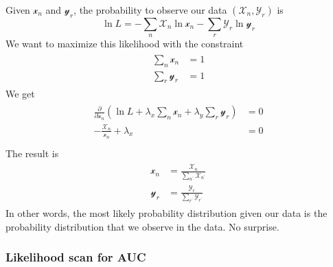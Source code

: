 \documentclass[11pt]{article}
\begin{document}
Given \(\mathscr{x}_n\) and \(\mathscr{y}_r\), the probability to observe our data \((\mathscr{X}_n, \mathscr{Y}_r)\) is
\begin{equation}
\ln{L}=-\sum_{n}\mathscr{X}_n\ln{\mathscr{x}_n}-\sum_{r}\mathscr{Y}_r\ln{\mathscr{y}_r}
\label{eq:discrete_loglikelihood}
\end{equation}
We want to maximize this likelihood with the constraint
\begin{align}
\begin{aligned}
\sum_n{\mathscr{x}_n}&=1 \\
\sum_r{\mathscr{y}_r}&=1
\end{aligned}
\label{eq:discrete_normalization}
\end{align}
We get
\begin{align}
\begin{aligned}
\frac{\partial}{\partial \mathscr{x}_n}(\ln{L} + \lambda_x \sum_n {\mathscr{x}_n} + \lambda_y \sum_r{\mathscr{y}_r})&=0 \\
-\frac{\mathscr{X}_n}{\mathscr{x}_n}+\lambda_x&=0 \\
\end{aligned}
\end{align}
The result is
\begin{align}
\begin{aligned}
\mathscr{x}_n&=\frac{\mathscr{X}_n}{\sum_{n^\prime}\mathscr{X}_{n^\prime}} \\
\mathscr{y}_r&=\frac{\mathscr{Y}_r}{\sum_{r^\prime}\mathscr{Y}_{r^\prime}}
\end{aligned}
\end{align}
In other words, the most likely probability distribution given our data is the probability distribution that we observe in the data.  No surprise.

\subsubsection{Likelihood scan for AUC}
\label{sec:discrete_likelihood_scan}
\end{document}
